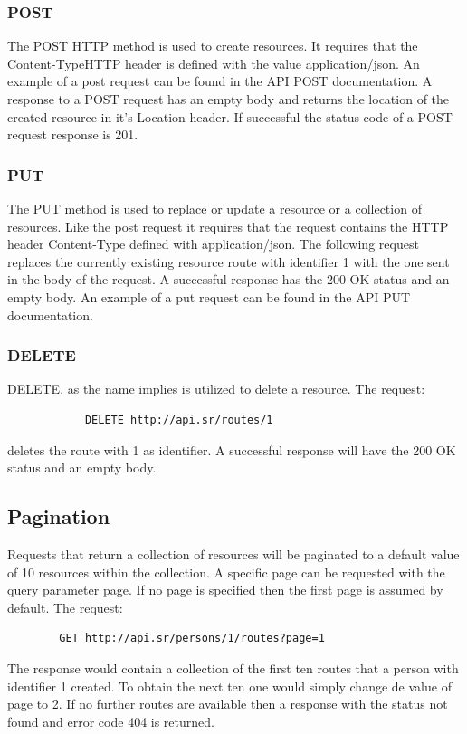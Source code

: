         \subsubsection*{POST}
        The POST HTTP method is used to create resources. It requires that the Content-Type\cite{contenttype}HTTP header is 
        defined with the value application/json\cite{applicationjson}. An example of a post request can be found in the 
        API POST\cite{apipostdocs} documentation. A response to a POST request has an empty body and returns the 
        location of the created resource in it's Location header. If successful the status code of a POST request response is 201.  
            
        \subsubsection*{PUT}
        The PUT method is used to replace or update a resource or a collection of resources. Like the post request it requires 
        that the request contains the HTTP header Content-Type defined with application/json.
        The following request replaces the currently existing resource route with identifier 1 with the one sent in 
        the body of the request. A successful response has the 200 OK status and an empty body. An example of a put 
        request can be found in the API PUT\cite{apiputdocs} documentation.

        \subsubsection*{DELETE}
        DELETE, as the name implies is utilized to delete a resource. The request: 
        \begin{verbatim}
            DELETE http://api.sr/routes/1
        \end{verbatim}
        \vspace{-\baselineskip} 
        deletes the route with 1 as identifier. A successful response will have the 200 OK status and an empty body.
    
    \subsection{Pagination}
    Requests that return a collection of resources will be paginated to a default value of 10 resources within the collection. 
    A specific page can be requested with the query parameter page. If no page is specified then the first page is assumed by default.
    The request:  
    \begin{verbatim}
        GET http://api.sr/persons/1/routes?page=1
    \end{verbatim}
    \vspace{-\baselineskip}
    The response would contain a collection of the first ten routes that a person with identifier 1 created.
    To obtain the next ten one would simply change de value of page to 2. If no further routes are available then a response with
    the status not found and error code 404 is returned.


